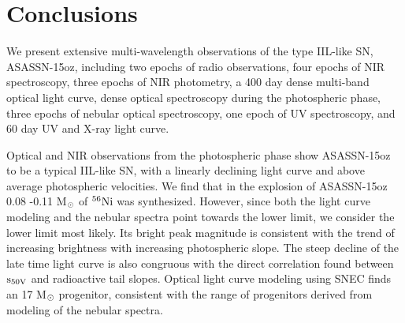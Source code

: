 \documentclass[a4paper,fleqn,usenatbib]{mnras}
\newcommand{\msun}{M$\rm{_{\odot}}$ }
\begin{document}
\section{Conclusions}\label{sec:conclude}
We present extensive multi-wavelength observations of the type IIL-like SN, ASASSN-15oz, including two epochs of radio observations, four epochs of NIR spectroscopy, three epochs of NIR photometry, a 400 day dense multi-band optical light curve, dense optical spectroscopy during the photospheric phase, three epochs of nebular optical spectroscopy,  one epoch of UV spectroscopy, and 60 day UV and X-ray light curve.

Optical and NIR observations from the photospheric phase show ASASSN-15oz to be a typical IIL-like SN, with a linearly declining light curve and above average photospheric velocities. 
We find that in the explosion of ASASSN-15oz 0.08 -0.11 \msun of $\rm{{}^{56}Ni}$ was synthesized. 
However, since both the light curve modeling and the nebular spectra point towards the lower limit, we consider the lower limit most likely.
Its bright peak magnitude is consistent with the trend of increasing brightness with increasing photospheric slope. 
The steep decline of the late time light curve is also congruous with the direct correlation found between $\rm{s_{50V}}$ and radioactive tail slopes.
Optical light curve modeling using SNEC finds an 17 \msun progenitor, consistent with the range of progenitors derived from modeling of the nebular spectra.
\end{document}
